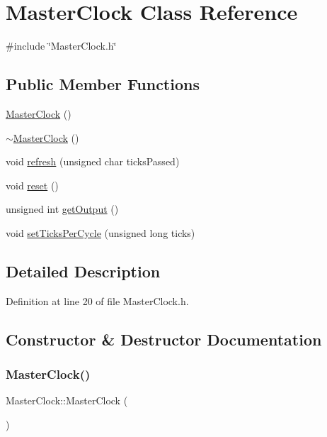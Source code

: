 \hypertarget{class_master_clock}{}\section{Master\+Clock Class Reference}
\label{class_master_clock}


{\ttfamily \#include \char`\"{}Master\+Clock.\+h\char`\"{}}

\subsection*{Public Member Functions}
\begin{DoxyCompactItemize}
\item 
\hyperlink{class_master_clock_a479dec94c2b2061cca4fd9ce6a8b207a}{Master\+Clock} ()
\item 
\hyperlink{class_master_clock_aa7ff1a5f175a32f2a1d1b05a9c5ecf53}{$\sim$\+Master\+Clock} ()
\item 
void \hyperlink{class_master_clock_ae6c0b35db2932b94ec823eac80347707}{refresh} (unsigned char ticks\+Passed)
\item 
void \hyperlink{class_master_clock_a21abae82a775a527de35a198859ce965}{reset} ()
\item 
unsigned int \hyperlink{class_master_clock_af63318129f4c13824614e73f549e5894}{get\+Output} ()
\item 
void \hyperlink{class_master_clock_a5df4dcf8523b8186a7c73f9357376a01}{set\+Ticks\+Per\+Cycle} (unsigned long ticks)
\end{DoxyCompactItemize}


\subsection{Detailed Description}


Definition at line 20 of file Master\+Clock.\+h.



\subsection{Constructor \& Destructor Documentation}
\mbox{\label{class_master_clock_a479dec94c2b2061cca4fd9ce6a8b207a}} 
\subsubsection{\texorpdfstring{Master\+Clock()}{MasterClock()}}
{\footnotesize\ttfamily Master\+Clock\+::\+Master\+Clock (\begin{DoxyParamCaption}{ }\end{DoxyParamCaption})}



